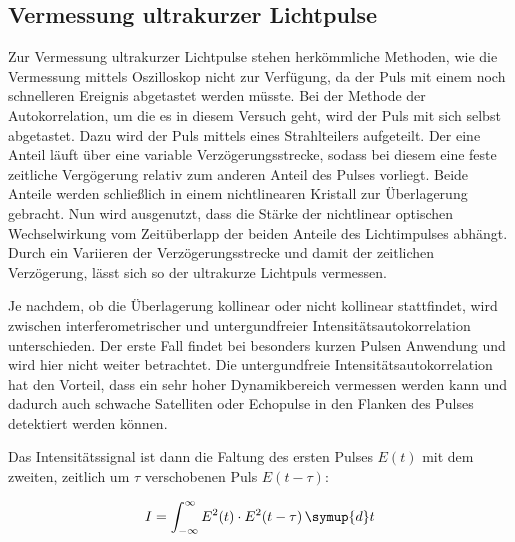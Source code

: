 \subsection{Vermessung ultrakurzer Lichtpulse}
Zur Vermessung ultrakurzer Lichtpulse stehen herkömmliche Methoden, wie die Vermessung mittels Oszilloskop nicht zur Verfügung, da 
der Puls mit einem noch schnelleren Ereignis abgetastet werden müsste.
Bei der Methode der Autokorrelation, um die es in diesem Versuch geht, wird der Puls mit sich selbst abgetastet.
Dazu wird der Puls mittels eines Strahlteilers aufgeteilt.
Der eine Anteil läuft über eine variable Verzögerungsstrecke,
sodass bei diesem eine feste zeitliche Vergögerung relativ zum 
anderen Anteil des Pulses vorliegt. Beide Anteile werden schließlich in einem 
nichtlinearen Kristall zur Überlagerung gebracht.
Nun wird ausgenutzt, dass die Stärke der nichtlinear optischen Wechselwirkung vom Zeitüberlapp der beiden Anteile des Lichtimpulses abhängt.
Durch ein Variieren der Verzögerungsstrecke und damit der zeitlichen Verzögerung, lässt sich so der ultrakurze Lichtpuls vermessen.

Je nachdem, ob die Überlagerung kollinear oder nicht kollinear stattfindet, wird
zwischen interferometrischer und untergundfreier Intensitätsautokorrelation unterschieden.
Der erste Fall findet bei besonders kurzen Pulsen Anwendung und wird hier nicht weiter betrachtet.
Die untergundfreie Intensitätsautokorrelation hat den Vorteil, dass ein sehr hoher Dynamikbereich vermessen werden kann
und dadurch auch schwache Satelliten oder Echopulse in den Flanken des Pulses detektiert werden können.

Das Intensitätssignal ist dann die Faltung des ersten Pulses $ E (t)$ mit dem zweiten, zeitlich um $\tau$ verschobenen Puls $E ( t-\tau)$:

\begin{equation}
    I = \int_{-\infty}^{\infty}E^2(t)\cdot E^2(t-\tau)\,\symup{d}t
\end{equation}

